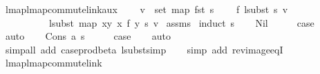 \begin{isabellebody}
%
\isadelimdocument
%
\endisadelimdocument
{}\isamarkupfalse%
\ lmap{\isacharunderscore}{\kern0pt}lmap{\isacharunderscore}{\kern0pt}commute{\isacharunderscore}{\kern0pt}link{\isacharunderscore}{\kern0pt}aux{\isacharcolon}{\kern0pt}\isanewline
\ \ \ \ {\isachardoublequoteopen}v\ {\isasymin}\ set\ {\isacharparenleft}{\kern0pt}map\ fst\ s{\isacharparenright}{\kern0pt}{\isachardoublequoteclose}\isanewline
\ \ \ \ {\isachardoublequoteopen}f\ {\isacharparenleft}{\kern0pt}lsubst\ s\ v{\isacharparenright}{\kern0pt}\ {\isacharequal}{\kern0pt}\isanewline
\ \ \ \ \ \ \ \ \ \ lsubst\ {\isacharparenleft}{\kern0pt}map\ {\isacharparenleft}{\kern0pt}{\isasymlambda}{\isacharparenleft}{\kern0pt}x{\isacharcomma}{\kern0pt}y{\isacharparenright}{\kern0pt}{\isachardot}{\kern0pt}\ {\isacharparenleft}{\kern0pt}x{\isacharcomma}{\kern0pt}\ f\ y{\isacharparenright}{\kern0pt}{\isacharparenright}{\kern0pt}\ s{\isacharparenright}{\kern0pt}\ v{\isachardoublequoteclose}\isanewline
%
\isadelimproof
%
\endisadelimproof
%
\isatagproof
{}\isamarkupfalse%
\ assms\isanewline
{}\isamarkupfalse%
\ {\isacharparenleft}{\kern0pt}induct\ s{\isacharparenright}{\kern0pt}\isanewline
\ \ \isamarkupfalse%
\ Nil\isanewline
\ \ \isamarkupfalse%
\ \isamarkupfalse%
\ {\isacharquery}{\kern0pt}case\isanewline
\ \ \isamarkupfalse%
\ auto\isanewline
{}\isamarkupfalse%
\isanewline
\ \ \isamarkupfalse%
\ {\isacharparenleft}{\kern0pt}Cons\ a\ s{\isacharparenright}{\kern0pt}\isanewline
\ \ \isamarkupfalse%
\ \isamarkupfalse%
\ {\isacharquery}{\kern0pt}case\isanewline
\ \ \isamarkupfalse%
\ auto\isanewline
\ \ \isamarkupfalse%
\ {\isacharparenleft}{\kern0pt}simp{\isacharunderscore}{\kern0pt}all\ add{\isacharcolon}{\kern0pt}\ case{\isacharunderscore}{\kern0pt}prod{\isacharunderscore}{\kern0pt}beta\ lsubst{\isacharunderscore}{\kern0pt}simp{\isacharparenright}{\kern0pt}\isanewline
\ \ \isamarkupfalse%
\ {\isacharparenleft}{\kern0pt}simp\ add{\isacharcolon}{\kern0pt}\ rev{\isacharunderscore}{\kern0pt}image{\isacharunderscore}{\kern0pt}eqI{\isacharparenright}{\kern0pt}\isanewline
{}\isamarkupfalse%
%
\endisatagproof
{\isafoldproof}%
%
\isadelimproof
\isanewline
%
\endisadelimproof
\isanewline
\isanewline
{}\isamarkupfalse%
\ lmap{\isacharunderscore}{\kern0pt}lmap{\isacharunderscore}{\kern0pt}commute{\isacharunderscore}{\kern0pt}link{\isacharcolon}{\kern0pt}\isanewline

\end{isabellebody}
